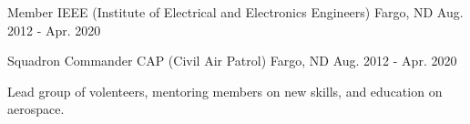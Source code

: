 

\begin{cventries}

  \cventry
    {Member} %
    {IEEE (Institute of Electrical and Electronics Engineers)} %
    {Fargo, ND} %
    {Aug. 2012 - Apr. 2020} %
    {
      \begin{cvitems} %
      \end{cvitems}
    }


  \cventry
    {Squadron Commander} %
    {CAP (Civil Air Patrol)} %
    {Fargo, ND} %
    {Aug. 2012 - Apr. 2020} %
    {
      \begin{cvitems} %
        \item {Lead group of volenteers, mentoring members on new skills, and education on aerospace.}
      \end{cvitems}
    }

\end{cventries}
